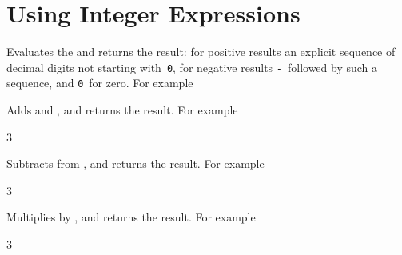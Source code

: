 \documentclass[oneside]{book}
\begin{document}
\section{Using Integer Expressions}

\begin{function}{\intEval}
\begin{syntax}
 
\end{syntax}
Evaluates the  and returns the result:
for positive results an
explicit sequence of decimal digits not starting with~\texttt{0},
for negative results \texttt{-}~followed by such a sequence, and
\texttt{0}~for zero. For example
\begin{demohigh}
\end{demohigh}
\begin{demohigh}
\end{demohigh}
\end{function}

\begin{function}{\intMathAdd}
\begin{syntax}
  
\end{syntax}
Adds  and ,
and returns the result. For example
\begin{demohigh}
 {3}
\end{demohigh}
\end{function}

\begin{function}{\intMathSub}
\begin{syntax}
  
\end{syntax}
Subtracts  from ,
and returns the result. For example
\begin{demohigh}
 {3}
\end{demohigh}
\end{function}

\begin{function}{\intMathMult}
\begin{syntax}
  
\end{syntax}
Multiplies  by ,
and returns the result. For example
\begin{demohigh}
 {3}
\end{demohigh}
\end{function}
\end{document}
